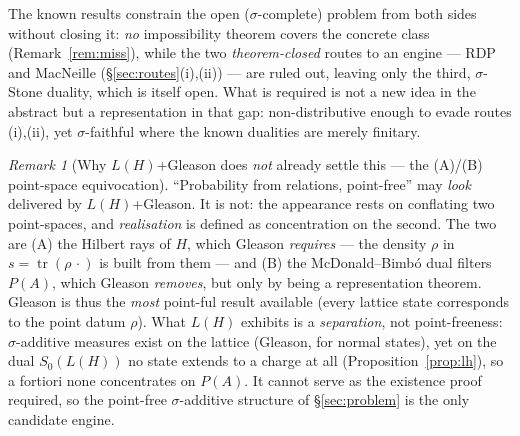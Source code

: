 \documentclass[11pt,reqno]{amsart}
\theoremstyle{plain}
\theoremstyle{definition}
\theoremstyle{remark}
\newtheorem{remark}[theorem]{Remark}
\newcommand{\tr}{\operatorname{tr}}
\begin{document}
\medskip
\noindent The known results constrain the open ($\sigma$-complete) problem from both
sides without closing it: \emph{no} impossibility theorem covers the concrete class
(Remark~\ref{rem:miss}), while the two \emph{theorem-closed} routes to an engine
--- RDP and MacNeille (\S\ref{sec:routes}(i),(ii)) --- are ruled out, leaving
only the third, $\sigma$-Stone duality, which is itself open. What is required is
not a new idea in the abstract but a representation in that gap:
non-distributive enough to evade routes (i),(ii), yet $\sigma$-faithful where the
known dualities are merely finitary.

\begin{remark}[Why $L(H)$+Gleason does \emph{not} already settle this ---
the (A)/(B) point-space equivocation]\label{rem:AB}
``Probability from relations, point-free'' may \emph{look} delivered by
$L(H)$+Gleason. It is not: the appearance rests on conflating two point-spaces, and
\emph{realisation} is defined as concentration on the second. The two are (A) the
Hilbert rays of $H$, which Gleason \emph{requires} --- the density $\rho$ in
$s=\tr(\rho\,\cdot)$ is built from them --- and (B) the McDonald--Bimb\'{o} dual
filters $P(A)$, which Gleason \emph{removes}, but only by being a representation
theorem. Gleason is thus the \emph{most} point-ful result available (every
lattice state corresponds to the point datum $\rho$). What $L(H)$ exhibits is a
\emph{separation}, not point-freeness: $\sigma$-additive measures exist on the
lattice (Gleason, for normal states), yet on the dual $S_0(L(H))$ no state extends
to a charge at all (Proposition~\ref{prop:lh}), so a fortiori none concentrates on
$P(A)$. It cannot serve as the existence proof required, so the point-free
$\sigma$-additive structure of \S\ref{sec:problem} is the only candidate engine.
\end{remark}
\end{document}
